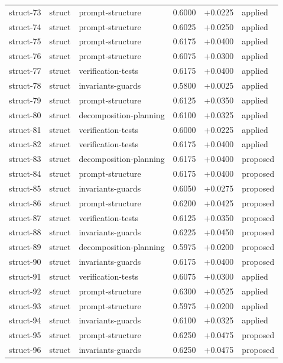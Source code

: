 \begin{center}
\begin{longtable}{llp{5.2cm}rrl}
struct-73 & struct & prompt-structure & 0.6000 & +0.0225 & applied \\
struct-74 & struct & prompt-structure & 0.6025 & +0.0250 & applied \\
struct-75 & struct & prompt-structure & 0.6175 & +0.0400 & applied \\
struct-76 & struct & prompt-structure & 0.6075 & +0.0300 & applied \\
struct-77 & struct & verification-tests & 0.6175 & +0.0400 & applied \\
struct-78 & struct & invariants-guards & 0.5800 & +0.0025 & applied \\
struct-79 & struct & prompt-structure & 0.6125 & +0.0350 & applied \\
struct-80 & struct & decomposition-planning & 0.6100 & +0.0325 & applied \\
struct-81 & struct & verification-tests & 0.6000 & +0.0225 & applied \\
struct-82 & struct & verification-tests & 0.6175 & +0.0400 & applied \\
struct-83 & struct & decomposition-planning & 0.6175 & +0.0400 & proposed \\
struct-84 & struct & prompt-structure & 0.6175 & +0.0400 & proposed \\
struct-85 & struct & invariants-guards & 0.6050 & +0.0275 & proposed \\
struct-86 & struct & prompt-structure & 0.6200 & +0.0425 & proposed \\
struct-87 & struct & verification-tests & 0.6125 & +0.0350 & proposed \\
struct-88 & struct & invariants-guards & 0.6225 & +0.0450 & proposed \\
struct-89 & struct & decomposition-planning & 0.5975 & +0.0200 & proposed \\
struct-90 & struct & invariants-guards & 0.6175 & +0.0400 & proposed \\
struct-91 & struct & verification-tests & 0.6075 & +0.0300 & applied \\
struct-92 & struct & prompt-structure & 0.6300 & +0.0525 & applied \\
struct-93 & struct & prompt-structure & 0.5975 & +0.0200 & applied \\
struct-94 & struct & invariants-guards & 0.6100 & +0.0325 & applied \\
struct-95 & struct & prompt-structure & 0.6250 & +0.0475 & proposed \\
struct-96 & struct & invariants-guards & 0.6250 & +0.0475 & proposed \\

\end{longtable}
\end{center}
